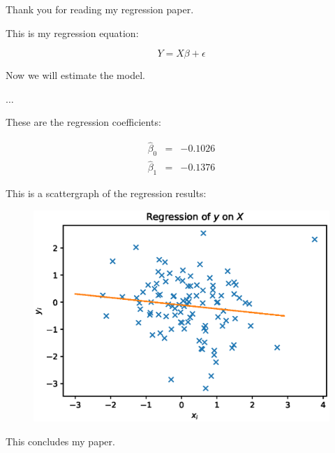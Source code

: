 \documentclass{paper}
\begin{document}
Thank you for reading my regression paper.


This is my regression equation:

\begin{equation}
%
	Y = X\beta + \epsilon
%
\end{equation}

Now we will estimate the model.



$\dots$



These are the regression coefficients:

\begin{align}
%
	\hat{\beta}_0 & = &    -0.1026 \\ 
%
	\hat{\beta}_1 & = &    -0.1376 
%
\end{align}

\pagebreak

This is a scattergraph of the regression results:

\begin{figure}
%
	\includegraphics[scale = 0.5]{../Figures/regression_plot.eps}
%
\end{figure}

This concludes my paper.
\end{document}
